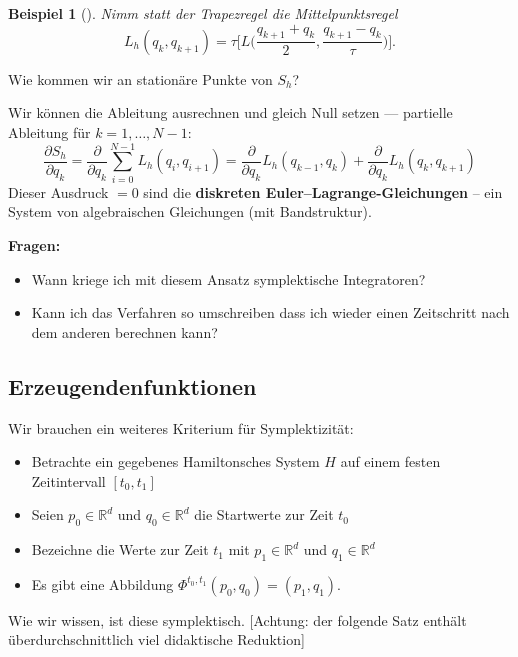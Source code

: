 \documentclass[german]{scrreprt}
\let\emph\textbf
\newcommand{\R}{\mathbb R}
\theoremstyle{plain}
\theoremstyle{nonumberplain}
\theoremstyle{nonumberplain}
\newtheorem{bsp}{Beispiel}
\theoremstyle{nonumberplain}
\begin{document}
\begin{bsp}[{{\cite[1997]{wendlandt_marsden:1997}}}]
	Nimm statt der Trapezregel die Mittelpunktsregel
	\begin{equation*}
	L_h(q_k, q_{k+1}) = \tau \Big[L\Big(\frac{q_{k+1} + q_k}{2}, \frac{q_{k+1} - q_k}{\tau}\Big)\Big].
	\end{equation*}
\end{bsp}


Wie kommen wir an stationäre Punkte von $S_h$?

Wir können die Ableitung ausrechnen und gleich Null setzen --- partielle Ableitung für $k=1, \dots, N-1$:
\begin{equation*}
\frac{\partial S_h}{\partial q_k}
=
\frac{\partial}{\partial q_k} \sum_{i=0}^{N-1} L_h (q_i, q_{i+1})
=
\frac{\partial}{\partial q_k} L_h(q_{k-1}, q_k) +  \frac{\partial}{\partial q_k} L_h(q_k, q_{k+1})
\end{equation*}
Dieser Ausdruck $=0$ sind die \emph{diskreten Euler--Lagrange-Gleichungen} -- ein System von algebraischen Gleichungen (mit Bandstruktur).

\textbf{Fragen:}
\begin{itemize}
	\item Wann kriege ich mit diesem Ansatz symplektische Integratoren?
	\item Kann ich das Verfahren so umschreiben dass ich wieder einen Zeitschritt nach dem anderen berechnen kann?
\end{itemize}

\subsection{Erzeugendenfunktionen}

Wir brauchen ein weiteres Kriterium für Symplektizität:
\begin{itemize}
	\item Betrachte ein gegebenes Hamiltonsches System $H$ auf einem festen Zeitintervall $[t_0,t_1]$
	\item Seien $p_0 \in \R^d$ und $q_0 \in \R^d$ die Startwerte zur Zeit $t_0$
	\item Bezeichne die Werte zur Zeit $t_1$ mit  $p_1 \in \R^d$ und $q_1 \in \R^d$
	\item Es gibt eine Abbildung $\Phi^{t_0,t_1}(p_0,q_0) = (p_1,q_1)$.
\end{itemize}

Wie wir wissen, ist diese symplektisch.
{[Achtung: der folgende Satz enthält überdurchschnittlich viel didaktische Reduktion]}
\end{document}
